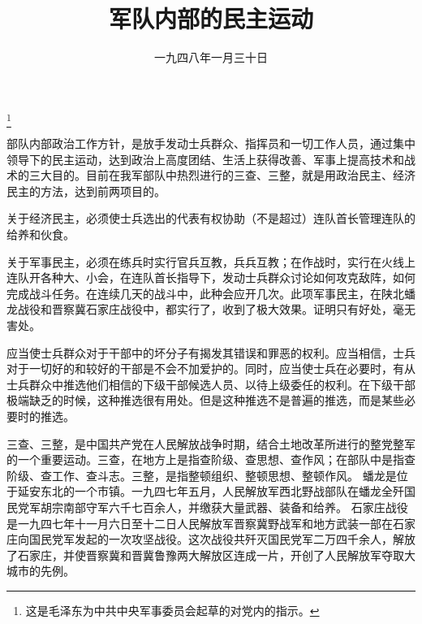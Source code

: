 
\title{军队内部的民主运动}
\date{一九四八年一月三十日}
\thanks{这是毛泽东为中共中央军事委员会起草的对党内的指示。}
\maketitle


部队内部政治工作方针，是放手发动士兵群众、指挥员和一切工作人员，通过集中领导下的民主运动，达到政治上高度团结、生活上获得改善、军事上提高技术和战术的三大目的。目前在我军部队中热烈进行的三查、三整，就是用政治民主、经济民主的方法，达到前两项目的。

关于经济民主，必须使士兵选出的代表有权协助（不是超过）连队首长管理连队的给养和伙食。

关于军事民主，必须在练兵时实行官兵互教，兵兵互教；在作战时，实行在火线上连队开各种大、小会，在连队首长指导下，发动士兵群众讨论如何攻克敌阵，如何完成战斗任务。在连续几天的战斗中，此种会应开几次。此项军事民主，在陕北蟠龙战役和晋察冀石家庄战役中，都实行了，收到了极大效果。证明只有好处，毫无害处。

应当使士兵群众对于干部中的坏分子有揭发其错误和罪恶的权利。应当相信，士兵对于一切好的和较好的干部是不会不加爱护的。同时，应当使士兵在必要时，有从士兵群众中推选他们相信的下级干部候选人员、以待上级委任的权利。在下级干部极端缺乏的时候，这种推选很有用处。但是这种推选不是普遍的推选，而是某些必要时的推选。


\begin{maonote}
三查、三整，是中国共产党在人民解放战争时期，结合土地改革所进行的整党整军的一个重要运动。三查，在地方上是指查阶级、查思想、查作风；在部队中是指查阶级、查工作、查斗志。三整，是指整顿组织、整顿思想、整顿作风。
蟠龙是位于延安东北的一个市镇。一九四七年五月，人民解放军西北野战部队在蟠龙全歼国民党军胡宗南部守军六千七百余人，并缴获大量武器、装备和给养。
石家庄战役是一九四七年十一月六日至十二日人民解放军晋察冀野战军和地方武装一部在石家庄向国民党军发起的一次攻坚战役。这次战役共歼灭国民党军二万四千余人，解放了石家庄，并使晋察冀和晋冀鲁豫两大解放区连成一片，开创了人民解放军夺取大城市的先例。
\end{maonote}
